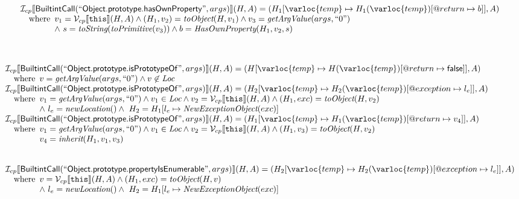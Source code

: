 \[\begin{array}{l}
\I _{cp}\lbr \SF{BuiltintCall}(``\SF{Object.prototype.hasOwnProperty}",args)\rbr(H,A)
 = (H_1[\varloc{temp}\mapsto H_1(\varloc{temp})[\varprop{return}\mapsto b]], A) \\
\quad\wherec{
  v_1 = \V _{cp}\lbr \TT{this}\rbr (H,A) \land (H_1, v_2) = \hf{toObject}(H, v_1)
  \land v_3 =  \hf{getArgValue}(args, ``0")\\
  \land\ s = \hf{toString}(\hf{toPrimitive}(v_3)) \land b = \hf{HasOwnProperty}(H_1, v_2, s)
  }\\
\\\\
\end{array}
\]

\[
\begin{array}{l}

\I _{cp}\lbr \SF{BuiltintCall}(``\SF{Object.prototype.isPrototypeOf}",args)\rbr(H,A)
 = (H[\varloc{temp}\mapsto H(\varloc{temp})[\varprop{return}\mapsto \SF{false}]], A) \\
\quad\wherec{
  v =  \hf{getArgValue}(args, ``0") \land v \not\in \Loc
  }\\

\I _{cp}\lbr \SF{BuiltintCall}(``\SF{Object.prototype.isPrototypeOf}",args)\rbr(H,A)
 = (H_2[\varloc{temp}\mapsto H_2(\varloc{temp})[\varprop{exception}\mapsto l_e]], A) \\
\quad\wherec{
  v_1 =  \hf{getArgValue}(args, ``0") \land v_1 \in \Loc
  \land v_2 = \V _{cp}\lbr \TT{this}\rbr (H,A) \land (H_1, exc) = \hf{toObject}(H, v_2) \\
  \land\ l_e = \hf{newLocation}() \land\ H_2=H_1[l_e\mapsto\hf{NewExceptionObject}(exc)] 
  }\\

\I _{cp}\lbr \SF{BuiltintCall}(``\SF{Object.prototype.isPrototypeOf}",args)\rbr(H,A)
 = (H_1[\varloc{temp}\mapsto H_1(\varloc{temp})[\varprop{return}\mapsto v_4]], A) \\
\quad\wherec{
  v_1 =  \hf{getArgValue}(args, ``0") \land v_1 \in \Loc
  \land v_2 = \V _{cp}\lbr \TT{this}\rbr (H,A) \land (H_1, v_3) = \hf{toObject}(H, v_2) \\
  v_4 = \hf{inherit}(H_1, v_1, v_3)
  }\\
\\\\



\I _{cp}\lbr \SF{BuiltintCall}(``\SF{Object.prototype.propertyIsEnumerable}",args)\rbr(H,A)
 = (H_2[\varloc{temp}\mapsto H_2(\varloc{temp})[\varprop{exception}\mapsto l_e]], A) \\
\quad\wherec{
  v = \V _{cp}\lbr \TT{this}\rbr (H,A) \land (H_1, exc) = \hf{toObject}(H, v) \\
  \land\ l_e = \hf{newLocation}() \land\ H_2=H_1[l_e\mapsto\hf{NewExceptionObject}(exc)] 
  }\\


\end{array}\]
